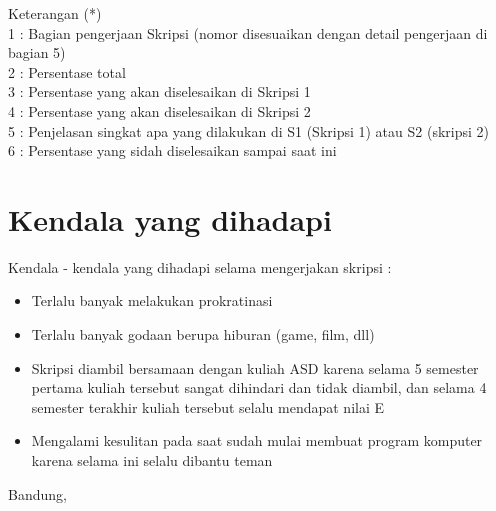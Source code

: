 \documentclass[a4paper,twoside]{article}
\begin{document}
Keterangan (*)\\
1 : Bagian pengerjaan Skripsi (nomor disesuaikan dengan detail pengerjaan di bagian 5)\\
2 : Persentase total \\
3 : Persentase yang akan diselesaikan di Skripsi 1 \\
4 : Persentase yang akan diselesaikan di Skripsi 2 \\
5 : Penjelasan singkat apa yang dilakukan di S1 (Skripsi 1) atau S2 (skripsi 2)\\
6 : Persentase yang sidah diselesaikan sampai saat ini 

\section{Kendala yang dihadapi}
Kendala - kendala yang dihadapi selama mengerjakan skripsi :
\begin{itemize}
	\item Terlalu banyak melakukan prokratinasi
	\item Terlalu banyak godaan berupa hiburan (game, film, dll)
	\item Skripsi diambil bersamaan dengan kuliah ASD karena selama 5 semester pertama kuliah tersebut sangat dihindari dan tidak diambil, dan selama 4 semester terakhir kuliah tersebut selalu mendapat nilai E
	\item Mengalami kesulitan pada saat sudah mulai membuat program komputer karena selama ini selalu dibantu teman
\end{itemize}

\vspace{1cm}
\centering Bandung, \tanggal\\
\vspace{2cm} \nama \\ 
\vspace{1cm}
\end{document}
